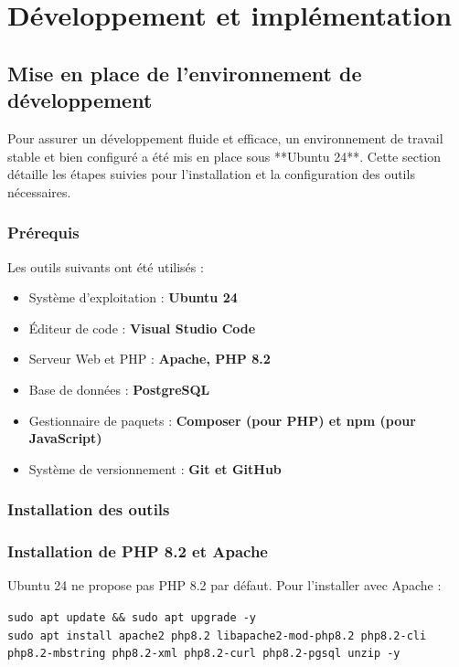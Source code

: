 \section{Développement et implémentation}
\subsection{Mise en place de l’environnement de développement}


Pour assurer un développement fluide et efficace, un environnement de travail stable et bien configuré a été mis en place sous **Ubuntu 24**. Cette section détaille les étapes suivies pour l’installation et la configuration des outils nécessaires.

\subsubsection{Prérequis}
Les outils suivants ont été utilisés :
\begin{itemize}
    \item Système d’exploitation : \textbf{Ubuntu 24}
    \item Éditeur de code : \textbf{Visual Studio Code}
    \item Serveur Web et PHP : \textbf{Apache, PHP 8.2}
    \item Base de données : \textbf{PostgreSQL}
    \item Gestionnaire de paquets : \textbf{Composer (pour PHP) et npm (pour JavaScript)}
    \item Système de versionnement : \textbf{Git et GitHub}
\end{itemize}

\subsubsection{Installation des outils}

\subsubsection*{Installation de PHP 8.2 et Apache}
Ubuntu 24 ne propose pas PHP 8.2 par défaut. Pour l’installer avec Apache :
\begin{tcolorbox}[colback=black, coltext=white, title=Installation de PHP 8.2 et Apache, fonttitle=\bfseries]
\texttt{sudo apt update \&\& sudo apt upgrade -y} \\
\texttt{sudo apt install apache2 php8.2 libapache2-mod-php8.2 php8.2-cli php8.2-mbstring php8.2-xml php8.2-curl php8.2-pgsql unzip -y}
\end{tcolorbox}

